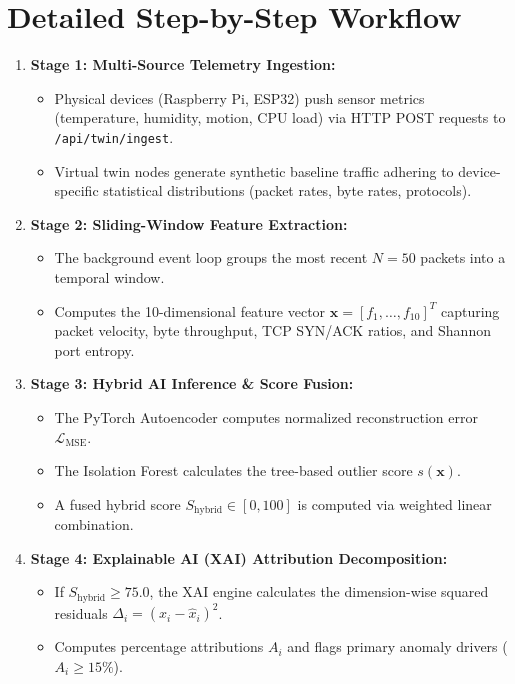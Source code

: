 \documentclass[12pt,a4paper]{report}
\begin{document}
\section{Detailed Step-by-Step Workflow}
\begin{enumerate}
    \item \textbf{Stage 1: Multi-Source Telemetry Ingestion:}
    \begin{itemize}
        \item Physical devices (Raspberry Pi, ESP32) push sensor metrics (temperature, humidity, motion, CPU load) via HTTP POST requests to \texttt{/api/twin/ingest}.
        \item Virtual twin nodes generate synthetic baseline traffic adhering to device-specific statistical distributions (packet rates, byte rates, protocols).
    \end{itemize}
    \item \textbf{Stage 2: Sliding-Window Feature Extraction:}
    \begin{itemize}
        \item The background event loop groups the most recent $N=50$ packets into a temporal window.
        \item Computes the 10-dimensional feature vector $\mathbf{x} = [f_1, \dots, f_{10}]^T$ capturing packet velocity, byte throughput, TCP SYN/ACK ratios, and Shannon port entropy.
    \end{itemize}
    \item \textbf{Stage 3: Hybrid AI Inference \& Score Fusion:}
    \begin{itemize}
        \item The PyTorch Autoencoder computes normalized reconstruction error $\mathcal{L}_{\text{MSE}}$.
        \item The Isolation Forest calculates the tree-based outlier score $s(\mathbf{x})$.
        \item A fused hybrid score $S_{\text{hybrid}} \in [0, 100]$ is computed via weighted linear combination.
    \end{itemize}
    \item \textbf{Stage 4: Explainable AI (XAI) Attribution Decomposition:}
    \begin{itemize}
        \item If $S_{\text{hybrid}} \ge 75.0$, the XAI engine calculates the dimension-wise squared residuals $\Delta_i = (x_i - \hat{x}_i)^2$.
        \item Computes percentage attributions $A_i$ and flags primary anomaly drivers ($A_i \ge 15\%$).

\end{itemize}
\end{enumerate}
\end{document}
